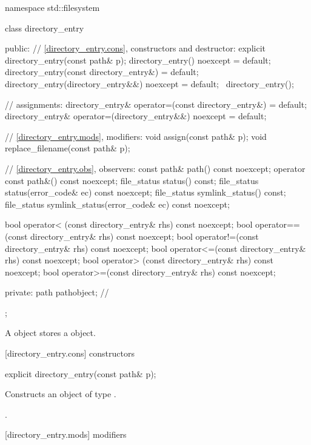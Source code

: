 %
\begin{codeblock}
namespace std::filesystem {
  class directory_entry {
  public:
    // \ref{directory_entry.cons}, constructors and destructor:
    explicit directory_entry(const path& p);
    directory_entry() noexcept = default;
    directory_entry(const directory_entry&) = default;
    directory_entry(directory_entry&&) noexcept = default;
   ~directory_entry();

    // assignments:
    directory_entry& operator=(const directory_entry&) = default;
    directory_entry& operator=(directory_entry&&) noexcept = default;

    // \ref{directory_entry.mods}, modifiers:
    void assign(const path& p);
    void replace_filename(const path& p);

    // \ref{directory_entry.obs}, observers:
    const path&  path() const noexcept;
    operator const path&() const noexcept;
    file_status  status() const;
    file_status  status(error_code& ec) const noexcept;
    file_status  symlink_status() const;
    file_status  symlink_status(error_code& ec) const noexcept;

    bool operator< (const directory_entry& rhs) const noexcept;
    bool operator==(const directory_entry& rhs) const noexcept;
    bool operator!=(const directory_entry& rhs) const noexcept;
    bool operator<=(const directory_entry& rhs) const noexcept;
    bool operator> (const directory_entry& rhs) const noexcept;
    bool operator>=(const directory_entry& rhs) const noexcept;

  private:
    path   pathobject; // \expos
  };
}
\end{codeblock}
\pnum
A  object stores a  object.

[directory_entry.cons]{ constructors}

%
\begin{itemdecl}
explicit directory_entry(const path& p);
\end{itemdecl}

\begin{itemdescr}
\pnum
\effects Constructs an object of type .

\pnum
\postcondition {}.
\end{itemdescr}

[directory_entry.mods]{ modifiers}

